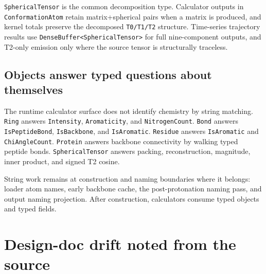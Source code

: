 \documentclass[11pt]{article}
\newcommand{\code}[1]{\texttt{#1}}
\begin{document}
\code{SphericalTensor} is the common decomposition type. Calculator outputs in
\code{ConformationAtom} retain matrix+spherical pairs when a matrix is
produced, and kernel totals preserve the decomposed \code{T0/T1/T2} structure.
Time-series trajectory results use \code{DenseBuffer<SphericalTensor>} for
full nine-component outputs, and T2-only emission only where the source tensor
is structurally traceless.

\subsection{Objects answer typed questions about themselves}

The runtime calculator surface does not identify chemistry by string matching.
\code{Ring} answers \code{Intensity}, \code{Aromaticity}, and
\code{NitrogenCount}. \code{Bond} answers \code{IsPeptideBond},
\code{IsBackbone}, and \code{IsAromatic}. \code{Residue} answers
\code{IsAromatic} and \code{ChiAngleCount}. \code{Protein} answers backbone
connectivity by walking typed peptide bonds. \code{SphericalTensor} answers
packing, reconstruction, magnitude, inner product, and signed T2 cosine.

String work remains at construction and naming boundaries where it belongs:
loader atom names, early backbone cache, the post-protonation naming pass, and
output naming projection. After construction, calculators consume typed
objects and typed fields.

\section{Design-doc drift noted from the source}
\end{document}
